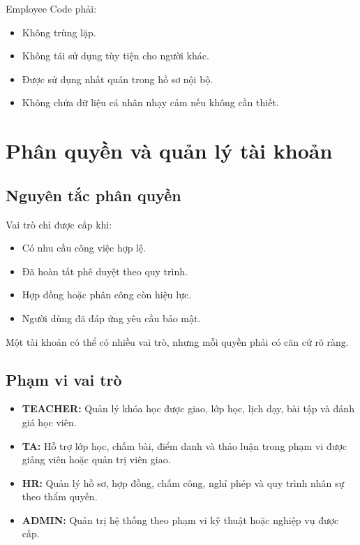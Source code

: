 \documentclass[12pt,a4paper]{article}
\begin{document}
Employee Code phải:

\begin{itemize}
    \item Không trùng lặp.
    \item Không tái sử dụng tùy tiện cho người khác.
    \item Được sử dụng nhất quán trong hồ sơ nội bộ.
    \item Không chứa dữ liệu cá nhân nhạy cảm nếu không cần thiết.
\end{itemize}

\section{Phân quyền và quản lý tài khoản}

\subsection{Nguyên tắc phân quyền}

Vai trò chỉ được cấp khi:

\begin{itemize}
    \item Có nhu cầu công việc hợp lệ.
    \item Đã hoàn tất phê duyệt theo quy trình.
    \item Hợp đồng hoặc phân công còn hiệu lực.
    \item Người dùng đã đáp ứng yêu cầu bảo mật.
\end{itemize}

Một tài khoản có thể có nhiều vai trò, nhưng mỗi quyền phải có căn cứ rõ ràng.

\subsection{Phạm vi vai trò}

\begin{itemize}
    \item \textbf{TEACHER:} Quản lý khóa học được giao, lớp học,
    lịch dạy, bài tập và đánh giá học viên.

    \item \textbf{TA:} Hỗ trợ lớp học, chấm bài, điểm danh và thảo luận
    trong phạm vi được giảng viên hoặc quản trị viên giao.

    \item \textbf{HR:} Quản lý hồ sơ, hợp đồng, chấm công, nghỉ phép
    và quy trình nhân sự theo thẩm quyền.

    \item \textbf{ADMIN:} Quản trị hệ thống theo phạm vi kỹ thuật
    hoặc nghiệp vụ được cấp.
\end{itemize}
\end{document}
